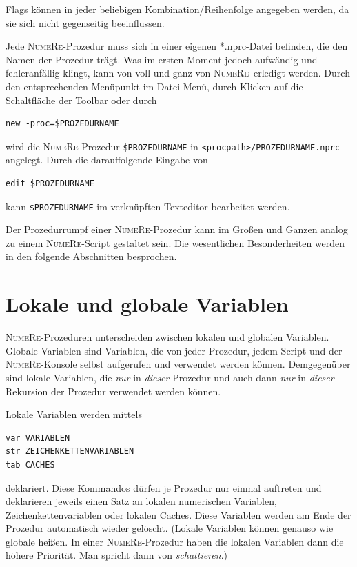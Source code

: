 \documentclass[DIV=14,headsepline,footsepline]{scrbook}
\newcommand{\NR}{\textsc{Nu\-me\-Re}}
\begin{document}
				Flags können in jeder beliebigen Kombination/Reihenfolge angegeben werden, da sie sich nicht gegenseitig beeinflussen.
				
				Jede \NR-Prozedur muss sich in einer eigenen *.nprc-Datei befinden, die den Namen der Prozedur trägt. Was im ersten Moment jedoch aufwändig und fehleranfällig klingt, kann von voll und ganz von \NR\ erledigt werden. Durch den entsprechenden Menüpunkt im Datei-Menü, durch Klicken auf die Schaltfläche der Toolbar oder durch
				\begin{lstlisting}
new -proc=$PROZEDURNAME
				\end{lstlisting}
				wird die \NR-Prozedur \lstinline+$PROZEDURNAME+ in \lstinline+<procpath>/PROZEDURNAME.nprc+ angelegt. Durch die darauffolgende Eingabe von
				\begin{lstlisting}
edit $PROZEDURNAME
				\end{lstlisting}
				kann \lstinline+$PROZEDURNAME+ im verknüpften Texteditor bearbeitet werden.
				
				Der Prozedurrumpf einer \NR-Prozedur kann im Großen und Ganzen analog zu einem \NR-Script gestaltet sein. Die wesentlichen Besonderheiten werden in den folgende Abschnitten besprochen.
			\section{Lokale und globale Variablen}
				\NR-Prozeduren unterscheiden zwischen lokalen und globalen Variablen. Globale Variablen sind Variablen, die von jeder Prozedur, jedem Script und der \NR-Konsole selbst aufgerufen und verwendet werden können. Demgegenüber sind lokale Variablen, die \emph{nur} in \emph{dieser} Prozedur und auch dann \emph{nur} in \emph{dieser} Rekursion der Prozedur verwendet werden können.
				
				Lokale Variablen werden mittels
				\begin{lstlisting}
var VARIABLEN
str ZEICHENKETTENVARIABLEN
tab CACHES
				\end{lstlisting}
				deklariert. Diese Kommandos dürfen je Prozedur nur einmal auftreten und deklarieren jeweils einen Satz an lokalen numerischen Variablen, Zeichenkettenvariablen oder lokalen Caches. Diese Variablen werden am Ende der Prozedur automatisch wieder gelöscht. (Lokale Variablen können genauso wie globale heißen. In einer \NR-Prozedur haben die lokalen Variablen dann die höhere Priorität. Man spricht dann von \emph{schattieren}.)
\end{document}
